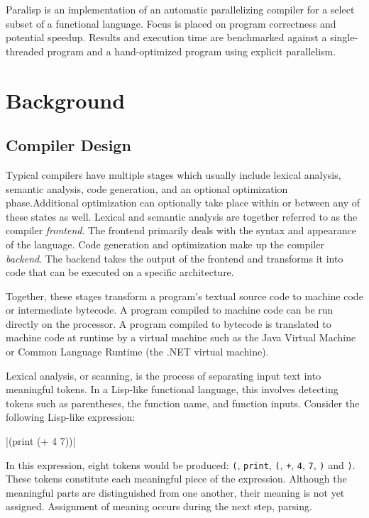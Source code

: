 \documentclass[abstracton]{scrartcl}
\begin{document}
Paralisp is an implementation of an automatic parallelizing compiler for a select subset of a functional language. Focus is placed on program correctness and potential speedup. Results and execution time are benchmarked against a single-threaded program and a hand-optimized program using explicit parallelism.

\section{Background}

\subsection{Compiler Design}

Typical compilers have multiple stages which usually include lexical analysis, semantic analysis, code generation, and an optional optimization phase.Additional optimization can optionally take place within or between any of these states as well. Lexical and semantic analysis are together referred to as the compiler \textit{frontend}. The frontend primarily deals with the syntax and appearance of the language. Code generation and optimization make up the compiler \textit{backend}. The backend takes the output of the frontend and transforms it into code that can be executed on a specific architecture.

Together, these stages transform a program's textual source code to machine code or intermediate bytecode. A program compiled to machine code can be run directly on the processor. A program compiled to bytecode is translated to machine code at runtime by a virtual machine such as the Java Virtual Machine or Common Language Runtime (the .NET virtual machine).

Lexical analysis, or scanning, is the process of separating input text into meaningful tokens. In a Lisp-like functional language, this involves detecting tokens such as parentheses, the function name, and function inputs. Consider the following Lisp-like expression:

\scheme|(print (+ 4 7))|

In this expression, eight tokens would be produced: \verb|(|, \verb|print|, \verb|(|, \verb|+|, \verb|4|, \verb|7|, \verb|)| and \verb|)|. These tokens constitute each meaningful piece of the expression. Although the meaningful parts are distinguished from one another, their meaning is not yet assigned. Assignment of meaning occurs during the next step, parsing.
\end{document}
